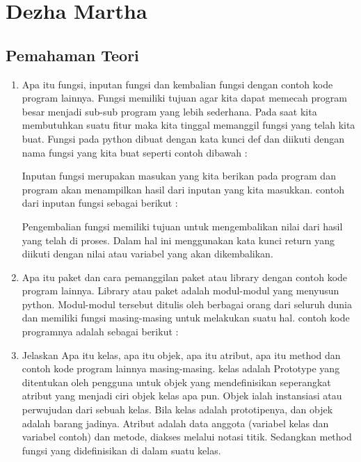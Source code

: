 \section{Dezha Martha}
\subsection{Pemahaman Teori}
\begin{enumerate}
    \item Apa itu fungsi, inputan fungsi dan kembalian fungsi dengan contoh kode program lainnya.
Fungsi memiliki tujuan agar kita dapat memecah program besar menjadi sub-sub program yang lebih sederhana. Pada saat kita membutuhkan suatu fitur maka kita tinggal memanggil fungsi yang telah kita buat. Fungsi pada python dibuat dengan kata kunci def dan diikuti dengan nama fungsi yang kita buat seperti contoh dibawah :
 
Inputan fungsi merupakan masukan yang kita berikan pada program dan program akan menampilkan hasil dari inputan yang kita masukkan. contoh dari inputan fungsi sebagai berikut :
 
Pengembalian fungsi memiliki tujuan untuk mengembalikan nilai dari hasil yang telah di proses. Dalam hal ini menggunakan kata kunci return yang diikuti dengan nilai atau variabel yang akan dikembalikan.
 

    \item Apa itu paket dan cara pemanggilan paket atau library dengan contoh kode program lainnya.
Library atau paket adalah modul-modul yang menyusun python. Modul-modul tersebut ditulis oleh berbagai orang dari seluruh dunia dan memiliki fungsi masing-masing untuk melakukan suatu hal. contoh kode programnya adalah sebagai berikut :
 

    \item Jelaskan Apa itu kelas, apa itu objek, apa itu atribut, apa itu method dan contoh kode program lainnya masing-masing.
kelas adalah Prototype yang ditentukan oleh pengguna untuk objek yang mendefinisikan seperangkat atribut yang menjadi ciri objek kelas apa pun. Objek ialah instansiasi atau perwujudan dari sebuah kelas. Bila kelas adalah prototipenya, dan objek adalah barang jadinya. Atribut adalah data anggota (variabel kelas dan variabel contoh) dan metode, diakses melalui notasi titik. Sedangkan method fungsi yang didefinisikan di dalam suatu kelas.
 


\end{enumerate}
